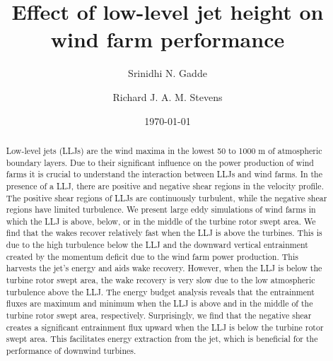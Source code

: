 \documentclass[%
 aip,
 amsmath,amssymb,
reprint,
twocolumn,%
author-numerical,%
]{revtex4-1}
\begin{document}

\title[LLJ \& shear]{\color{black}Effect of low-level jet height on wind farm performance}

\author{Srinidhi N. Gadde}
\author{Richard J. A. M. Stevens}%

\date{\today}%

\begin{abstract}
Low-level jets (LLJs) are the wind maxima in the lowest 50 to 1000 m of atmospheric boundary layers. Due to their significant influence on the power production of wind farms it is crucial to understand the interaction between LLJs and wind farms. In the presence of a LLJ, there are positive and negative shear regions in the velocity profile. The positive shear regions of LLJs are continuously turbulent, while the negative shear regions have limited turbulence. We present large eddy simulations of wind farms in which the LLJ is above, below, or in the middle of the turbine rotor swept area. We find that the wakes recover relatively fast when the LLJ is above the turbines. This is due to the high turbulence below the LLJ and the downward vertical entrainment created by the momentum deficit due to the wind farm power production. This harvests the jet's energy and aids wake recovery. However, when the LLJ is below the turbine rotor swept area, the wake recovery is very slow due to the low atmospheric turbulence above the LLJ. The energy budget analysis reveals that the entrainment fluxes are maximum and minimum when the LLJ is above and in the middle of the turbine rotor swept area, respectively. Surprisingly, we find that the negative shear creates a significant entrainment flux upward when the LLJ is below the turbine rotor swept area. This facilitates energy extraction from the jet, which is beneficial for the performance of downwind turbines.
\end{abstract}

\maketitle
\end{document}
